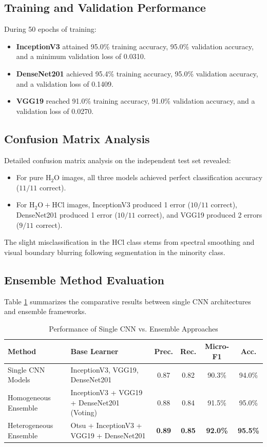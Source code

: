 \documentclass[conference]{IEEEtran}
\begin{document}
\subsection{Training and Validation Performance}
During 50 epochs of training:
\begin{itemize}
    \item \textbf{InceptionV3} attained 95.0\% training accuracy, 95.0\% validation accuracy, and a minimum validation loss of 0.0310.
    \item \textbf{DenseNet201} achieved 95.4\% training accuracy, 95.0\% validation accuracy, and a validation loss of 0.1409.
    \item \textbf{VGG19} reached 91.0\% training accuracy, 91.0\% validation accuracy, and a validation loss of 0.0270.
\end{itemize}

\subsection{Confusion Matrix Analysis}
Detailed confusion matrix analysis on the independent test set revealed:
\begin{itemize}
    \item For pure $\text{H}_2\text{O}$ images, all three models achieved perfect classification accuracy ($11/11$ correct).
    \item For $\text{H}_2\text{O} + \text{HCl}$ images, InceptionV3 produced 1 error ($10/11$ correct), DenseNet201 produced 1 error ($10/11$ correct), and VGG19 produced 2 errors ($9/11$ correct).
\end{itemize}
The slight misclassification in the HCl class stems from spectral smoothing and visual boundary blurring following segmentation in the minority class.

\subsection{Ensemble Method Evaluation}
Table \ref{tab:ensemble} summarizes the comparative results between single CNN architectures and ensemble frameworks.

\begin{table}[htbp]
\caption{Performance of Single CNN vs. Ensemble Approaches}
\label{tab:ensemble}
\centering
\begin{tabular}{p{2.6cm}p{2.3cm}cccc}
\toprule
\textbf{Method} & \textbf{Base Learner} & \textbf{Prec.} & \textbf{Rec.} & \textbf{Micro-F1} & \textbf{Acc.} \\
\midrule
Single CNN Models & InceptionV3, VGG19, DenseNet201 & 0.87 & 0.82 & 90.3\% & 94.0\% \\
\addlinespace
Homogeneous Ensemble & InceptionV3 + VGG19 + DenseNet201 (Voting) & 0.88 & 0.84 & 91.5\% & 95.0\% \\
\addlinespace
Heterogeneous Ensemble & Otsu + InceptionV3 + VGG19 + DenseNet201 & \textbf{0.89} & \textbf{0.85} & \textbf{92.0\%} & \textbf{95.5\%} \\
\bottomrule
\end{tabular}
\end{table}
\end{document}
